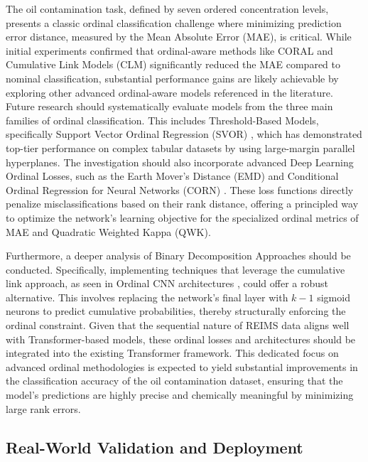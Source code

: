 The oil contamination task, defined by seven ordered concentration levels, presents a classic ordinal classification challenge where minimizing prediction error distance, measured by the Mean Absolute Error (MAE), is critical. While initial experiments confirmed that ordinal-aware methods like CORAL and Cumulative Link Models (CLM) significantly reduced the MAE compared to nominal classification, substantial performance gains are likely achievable by exploring other advanced ordinal-aware models referenced in the literature. Future research should systematically evaluate models from the three main families of ordinal classification. This includes Threshold-Based Models, specifically Support Vector Ordinal Regression (SVOR) \citep{herbrich1999support, chu2007support}, which has demonstrated top-tier performance on complex tabular datasets by using large-margin parallel hyperplanes. The investigation should also incorporate advanced Deep Learning Ordinal Losses, such as the Earth Mover's Distance (EMD) \citep{dematos2019emd} and Conditional Ordinal Regression for Neural Networks (CORN) \citep{shi2021corn}. These loss functions directly penalize misclassifications based on their rank distance, offering a principled way to optimize the network's learning objective for the specialized ordinal metrics of MAE and Quadratic Weighted Kappa (QWK).

Furthermore, a deeper analysis of Binary Decomposition Approaches should be conducted. Specifically, implementing techniques that leverage the cumulative link approach, as seen in Ordinal CNN architectures \citep{Niu2016}, could offer a robust alternative. This involves replacing the network's final layer with $k-1$ sigmoid neurons to predict cumulative probabilities, thereby structurally enforcing the ordinal constraint. Given that the sequential nature of REIMS data aligns well with Transformer-based models, these ordinal losses and architectures should be integrated into the existing Transformer framework. This dedicated focus on advanced ordinal methodologies is expected to yield substantial improvements in the classification accuracy of the oil contamination dataset, ensuring that the model's predictions are highly precise and chemically meaningful by minimizing large rank errors.

\subsection{Real-World Validation and Deployment}

